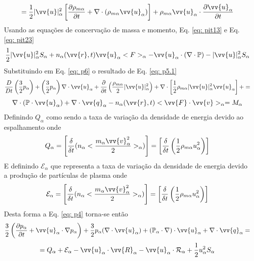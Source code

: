 \documentclass[12pt,oneside,a4paper]{abntex2}
\begin{document}
\begin{equation*}
= \frac{1}{2}|\vv{u}|^2_\alpha \left[  \frac{\partial \rho_{m\alpha} }{\partial t} +  \nabla \cdot (\rho_{m\alpha} \vv{u}_\alpha)   \right] + \rho_{m\alpha}  \vv{u}_\alpha \cdot \frac{\partial \vv{u}_\alpha}{\partial t}
\end{equation*}
 Usando as equações de concervação de massa e momento, Eq. \ref{eq: pit13} e Eq. \ref{eq: pit23} 
\begin{equation}
\label{eq: p6}
 \frac{1}{2}|\vv{u}|^2_\alpha S_\alpha + n_\alpha(\vv{r},t)\vv{u}_\alpha<F>_\alpha-\vv{u}_\alpha \cdot (\nabla \cdot \mathbb{P})-|\vv{u}|^2_\alpha S_\alpha
 \end{equation} 
 Substituindo em Eq.  \ref{eq: p6} o resultado de Eq. \ref{eq: p5.1}
 \begin{equation}
\label{eq: p5}
\frac{D}{Dt} \left( \frac{3}{2}p_\alpha \right) + \left(\frac{3}{2}p_\alpha \right)  \nabla \cdot \vv{u}_\alpha +  \frac{\partial }{\partial t} \left(\frac{\rho_{m\alpha}}{2} |\vv{u}|^2_\alpha \right) +\nabla \cdot \left[ \frac{1}{2}\rho_{m\alpha}|\vv{u}|^2_\alpha \vv{u}_\alpha \right]+  = 
\end{equation}
\begin{equation*}
\nabla \cdot (\mathbb{P} \cdot \vv{u}_\alpha) + \nabla \cdot \vv{q}_\alpha-n_\alpha(\vv{r},t) <\vv{F} \cdot \vv{v}>_\alpha = M_\alpha
\end{equation*}
Definindo  $Q_\alpha$ como sendo a taxa de variação da densidade de energia devido ao espalhamento onde
\begin{equation}
Q_\alpha = \left[ \frac{\delta}{\delta t}(n_\alpha<\frac{m_\alpha \vv{v}^2_\alpha}{2}>_\alpha) \right] = \left[ \frac{\delta}{\delta t}\left( \frac{1}{2} \rho_{m\alpha} u^2_\alpha \right) \right]
\end{equation}
E definindo $\mathcal{E}_\alpha$ que representa a taxa de variação da densidade de energia devido a produção de partículas de plasma onde 
\begin{equation}
\mathcal{E}_\alpha = \left[ \frac{\delta}{\delta t}(n_\alpha<\frac{m_\alpha \vv{v}^2_\alpha}{2}>_\alpha) \right] = \left[ \frac{\delta}{\delta t}\left( \frac{1}{2} \rho_{m\alpha} u^2_\alpha \right) \right]
\end{equation}
Desta forma a Eq. \ref{eq: p4} torna-se então
\begin{equation}
\label{concenergia}
\frac{3}{2} \left( \frac{\partial p_\alpha}{\partial t} + \vv{u}_\alpha \cdot \nabla p_\alpha\right)+ \frac{3}{2} p_\alpha (\nabla \cdot \vv{u}_\alpha)+(\mathbb{P}_\alpha \cdot \nabla)\cdot \vv{u}_\alpha + \nabla \cdot \vv{q}_\alpha =  
\end{equation}
\begin{equation*}
= Q_\alpha + \mathcal{E}_\alpha-\vv{u}_\alpha \cdot \vv{R}_\alpha - \vv{u}_\alpha \cdot \mathcal{R}_\alpha+\frac{1}{2}u^2_\alpha S_\alpha
\end{equation*}
\end{document}
